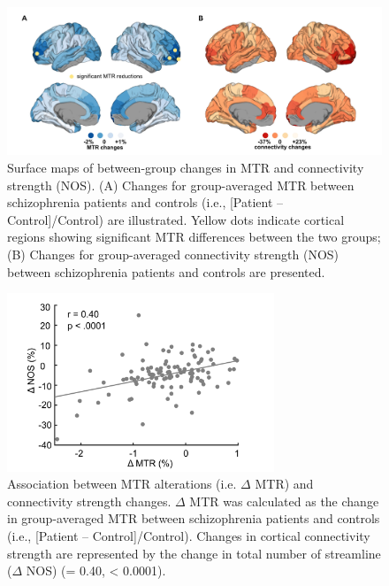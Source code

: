 \begin{refsection}
\begin{figure}[h]
    \centering
    \includegraphics[width=\linewidth]{images/mtrFig2.jpg}
    \caption{Surface maps of between-group changes in MTR and connectivity strength (NOS). (A) Changes for group-averaged MTR between schizophrenia patients and controls (i.e., {[}Patient – Control{]}/Control) are illustrated. Yellow dots indicate cortical regions showing significant MTR differences between the two groups; (B) Changes for group-averaged connectivity strength (NOS) between schizophrenia patients and controls are presented.}
    \label{mtrFig2}
\end{figure}

\begin{figure}[h]
    \centering
    \includegraphics[width=8cm]{images/mtrFig3.jpg}
    \caption{Association between MTR alterations (i.e. $\Delta$ MTR) and connectivity strength changes. $\Delta$ MTR was calculated as the change in group-averaged MTR between schizophrenia patients and controls (i.e., {[}Patient – Control{]}/Control). Changes in cortical connectivity strength are represented by the change in total number of streamline ($\Delta$ NOS) (\rval = 0.40, \pval < 0.0001).}
    \label{mtrFig3}
\end{figure}


\end{refsection}
